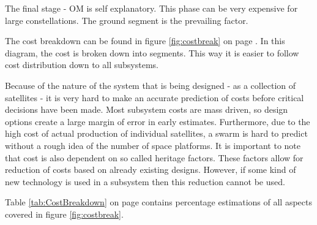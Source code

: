 The final stage - \ac{OM} is self explanatory. This phase can be very expensive for large constellations. The ground segment is the prevailing factor.

The cost breakdown can be found in figure \ref{fig:costbreak} on page \pageref{fig:costbreak}. In this diagram, the cost is broken down into segments. This way it is easier to follow cost distribution down to all subsystems.

Because of the nature of the system that is being designed - as a collection of satellites - it is very hard to make an accurate prediction of costs before critical decisions have been made. Most subsystem costs are mass driven, so design options create a large margin of error in early estimates. Furthermore, due to the high cost of actual production of individual satellites, a swarm is hard to predict without a rough idea of the number of space platforms. It is important to note that cost is also dependent on so called heritage factors. These factors allow for reduction of costs based on already existing designs. However, if some kind of new technology is used in a subsystem then this reduction cannot be used.

Table \ref{tab:CostBreakdown} on page \pageref{tab:CostBreakdown} contains percentage estimations of all aspects covered in figure \ref{fig:costbreak}.


